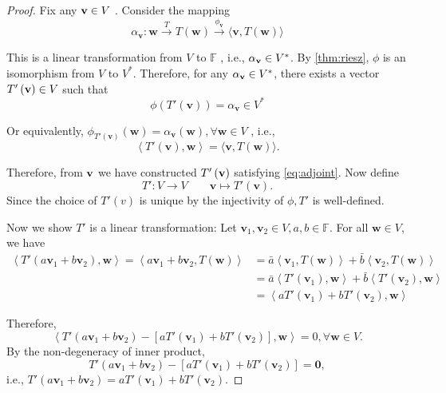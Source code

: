 \begin{proof} Fix any \({\bf v} \in  V\) . Consider the mapping
\[
{\alpha }_{\mathbf{v}} : \mathbf{w}\overset{T}{ \rightarrow  }T\left( \mathbf{w}\right) \overset{{\phi }_{\mathbf{v}}}{ \rightarrow  }\langle \mathbf{v},T\left( \mathbf{w}\right) \rangle
\]

This is a linear transformation from \(V\) to \(\mathbb{F}\) , i.e., \({\alpha }_{\bf v} \in  V^{ * }\). By \autoref{thm:riesz}, \(\phi\) is an isomorphism from \(V\) to \(V^{ * }\). Therefore, for any \({\alpha }_{\bf v} \in  {V}^{ * }\), there exists a vector \(T'\left( {\bf v}\right)  \in  V\) such that
\[
\phi \left( {T'\left( \mathbf{ v}\right) }\right)  = {\alpha }_{\mathbf{v}} \in  {V}^{ * }
\]

Or equivalently, \({\phi }_{T'\left( \mathbf{v}\right) }\left( \mathbf{w}\right)  = {\alpha }_{\mathbf{v}}\left( \mathbf{w}\right) ,\forall \mathbf{w} \in  V\) , i.e., 
\begin{equation}\label{eq:adjoint}\left\langle  {T'\left( \mathbf{v}\right) ,\mathbf{w}}\right\rangle   = \langle \mathbf{v},T\left( \mathbf{w}\right) \rangle.\end{equation}

Therefore, from \(\bf v\) we have constructed \(T'\left(\bf v\right)\) satisfying \autoref{eq:adjoint}. Now define 
\[T' : V \rightarrow  V \quad \quad  \mathbf{v} \mapsto  T'\left( \mathbf{v}\right).\]
Since the choice of \(T'\left( v\right)\) is unique by the injectivity of \(\phi ,T'\) is well-defined. 

Now we show \(T'\) is a linear transformation: Let \({\mathbf{v}}_{1},{\mathbf{v}}_{2} \in  V,a,b \in \mathbb{F}\). For all \(\mathbf{w} \in  V\), we have
\begin{align*}
\left\langle  {T'\left( {a{\mathbf{v}}_{1} + b{\mathbf{v}}_{2}}\right) ,\mathbf{w}}\right\rangle   = \left\langle  {a{\mathbf{v}}_{1} + b{\mathbf{v}}_{2},T\left( \mathbf{w}\right) }\right\rangle
&= \bar{a}\left\langle  {{\mathbf{v}}_{1},T\left( \mathbf{w}\right) }\right\rangle   + \bar{b}\left\langle  {{\mathbf{v}}_{2},T\left( \mathbf{w}\right) }\right\rangle
\\
&= \bar{a}\left\langle  {T'\left( {\mathbf{v}}_{1}\right) ,\mathbf{w}}\right\rangle   + \bar{b}\left\langle  {T'\left( {\mathbf{v}}_{2}\right) ,\mathbf{w}}\right\rangle
\\
&= \left\langle  {aT'\left( {\mathbf{v}}_{1}\right)  + bT'\left( {\mathbf{v}}_{2}\right) ,\mathbf{w}}\right\rangle
\end{align*}

Therefore, 
\[
\left\langle  {T'\left( {a{\mathbf{v}}_{1} + b{\mathbf{v}}_{2}}\right)  - \left\lbrack  {aT'\left( {\mathbf{v}}_{1}\right)  + bT'\left( {\mathbf{v}}_{2}\right) }\right\rbrack  ,\mathbf{w}}\right\rangle   = 0,\forall \mathbf{w} \in  V.
\]
By the non-degeneracy of inner product,
\[
T'\left( {a{\mathbf{v}}_{1} + b{\mathbf{v}}_{2}}\right)  - \left\lbrack  {aT'\left( {\mathbf{v}}_{1}\right)  + bT'\left( {\mathbf{v}}_{2}\right) }\right\rbrack   = \mathbf{0},
\]
i.e., \(T'\left( {a{\mathbf{v}}_{1} + b{\mathbf{v}}_{2}}\right)  = aT'\left( {\mathbf{v}}_{1}\right)  + bT'\left( {\mathbf{v}}_{2}\right)\).
\end{proof}

